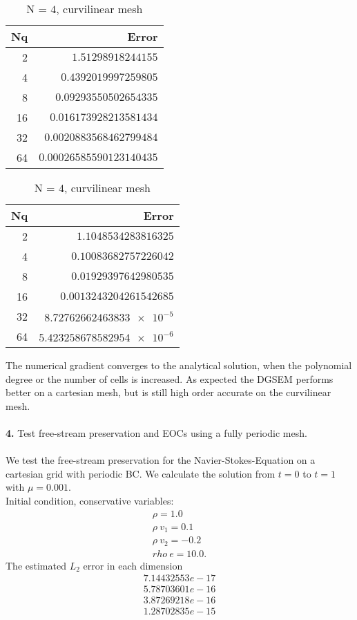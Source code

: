 \documentclass[11pt]{scrartcl}
\begin{document}
\begin{table}[H]
	\parbox{.45\linewidth}{
		\centering
		\begin{tabular}{|r|r|}
			\hline\hline
			\textbf{Nq} & \textbf{Error} \\\hline
			2 & $\num{1.51298918244155}$   \\
			4 & $\num{0.4392019997259805}$  \\
			8 & $\num{0.09293550502654335}$ \\
			16 & $\num{0.016173928213581434}$ \\
			32 & $\num{0.0020883568462799484}$ \\
			64 & $\num{0.00026585590123140435}$ \\\hline
		\end{tabular}
		\caption{N = $3$, curvilinear mesh}
	}
	\hspace{0.5cm}
	\parbox{.45\linewidth}{
		\centering
		\begin{tabular}{|r|r|}
			\hline\hline
			\textbf{Nq} & \textbf{Error} \\\hline
			2 & $\num{1.1048534283816325}$   \\
			4 & $\num{0.10083682757226042}$  \\
			8 & $\num{0.01929397642980535}$ \\
			16 & $\num{0.0013243204261542685}$ \\
			32 & $\num{8.72762662463833e-5}$ \\
			64 & $\num{5.423258678582954e-6}$ \\\hline
		\end{tabular}
		\caption{N = $4$, curvilinear mesh}
	}
\end{table}
The numerical gradient converges to the analytical solution, when the polynomial degree or the number of cells is increased. As expected the DGSEM performs better on a cartesian mesh, but is still high order accurate on the curvilinear mesh. \\ \ \\

\textbf{4.} Test free-stream preservation and EOCs using a fully periodic mesh.\\
\\
We test the free-stream preservation for the Navier-Stokes-Equation on a cartesian grid with periodic BC.
We calculate the solution from $t=0$ to $t=1$ with $\mu = 0.001$.\\
Initial condition, conservative variables:
\begin{align*}
	\rho = 1.0 \\
  	\rho \ v_1 = 0.1 \\
  	\rho \ v_2 = -0.2 \\
  	rho \ e = 10.0.
\end{align*}
The estimated $L_2$ error in each dimension
\begin{align*}
7.14432553e-17 \\ 5.78703601e-16\\ 3.87269218e-16  \\ 1.28702835e-15
\end{align*}
\end{document}
